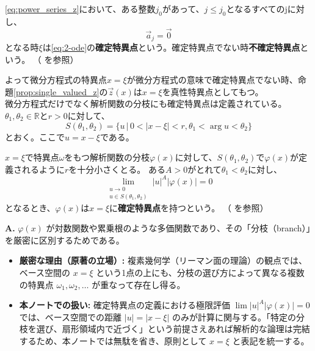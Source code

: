 \begin{definition}[微分方程式の確定特異点]
    \eqref{eq:power_series_z}において、ある整数$j_{0}$があって、$j\leq j_{0}$となるすべてのjに対し、
    \[
    \vec{a}_{j} = \vec{0}
    \]
    となる時$\xi$は\eqref{eq:2-ode}の\textbf{確定特異点}という。確定特異点でない時\textbf{不確定特異点}という。
    （\cite[p.59 定義2.4]{book:okamoto} を参照）
\end{definition}

よって微分方程式の特異点$x=\xi$が微分方程式の意味で確定特異点でない時、命題\ref{prop:single_valued_z}の$\vec{z}(x)$は$x=\xi$を真性特異点としてもつ。\\

微分方程式だけでなく解析関数の分枝にも確定特異点は定義されている。\\
$\theta_{1},\theta_{2}\in\mathbb{R}$と$r>0$に対して、
\[
S(\theta_{1},\theta_{2}) = \{u\,|\, 0<|x-\xi|<r, \theta_{1} < \arg u < \theta_{2} \}
\]
とおく。ここで$u=x-\xi$である。

\begin{definition}[解析的な解の確定特異点]
    $x=\xi$で特異点$\omega$をもつ解析関数の分枝$\varphi(x)$に対して、$S(\theta_{1},\theta_{2})$で$\varphi(x)$が定義されるように$r$を十分小さくとる。
    ある$A>0$がとれて$\theta_{1}<\theta_{2}$に対し、
    \[
    \lim_{\substack{u\to 0 \\ u\in S(\theta_{1},\theta_{2})}}|u|^{A}|\varphi(x)| = 0
    \]
    となるとき、$\varphi(x)$は$x=\xi$に\textbf{確定特異点}を持つという。
    （\cite[p.60 定義2.5]{book:okamoto} を参照）
\end{definition}

\begin{Q}
\textbf{A.} $\varphi(x)$ が対数関数や累乗根のような多価関数であり、その「分枝（branch）」を厳密に区別するためである。
\begin{itemize}
    \item \textbf{厳密な理由（原著の立場）:} 複素幾何学（リーマン面の理論）の観点では、ベース空間の $x=\xi$ という1点の上にも、分枝の選び方によって異なる複数の特異点 $\omega_1, \omega_2, \dots$ が重なって存在し得る。
    \item \textbf{本ノートでの扱い:} 確定特異点の定義における極限評価 $\lim |u|^A|\varphi(x)|=0$ では、ベース空間での距離 $|u| = |x-\xi|$ のみが計算に関与する。「特定の分枝を選び、扇形領域内で近づく」という前提さえあれば解析的な論理は完結するため、本ノートでは無駄を省き、原則として $x=\xi$ と表記を統一する。
\end{itemize}
\end{Q}

